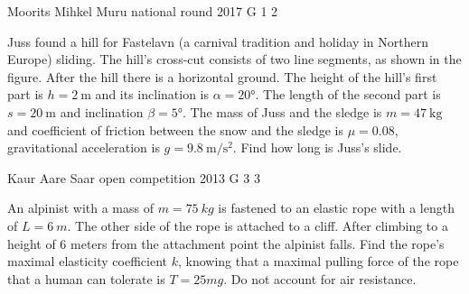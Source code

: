 \documentclass[11pt]{article}
\begin{document}
{Moorits Mihkel Muru} %
{national round} %
{2017} %
{G 1} %
{2} %
{

\ifEngStatement
\begin{figure}
	\vspace{-5pt}
\end{figure}
Juss found a hill for Fastelavn (a carnival tradition and holiday in Northern Europe) sliding. The hill’s cross-cut consists of two line segments, as shown in the figure. After the hill there is a horizontal ground. The height of the hill’s first part is \(h=\SI{2}{\meter}\) and its inclination is \(\alpha=\ang{20}\). The length of the second part is \(s=\SI{20}{\meter}\) and inclination \(\beta=\ang{5}\). The mass of Juss and the sledge is \(m=\SI{47}{\kilogram}\) and coefficient of friction between the snow and the sledge is \(\mu=\num{0.08}\), gravitational acceleration is \(g=\SI{9.8}{\meter\per\second\squared}\). Find how long is Juss’s slide.
\fi
}

{Kaur Aare Saar} %
{open competition} %
{2013} %
{G 3} %
{3} %
{

\ifEngStatement
An alpinist with a mass of $m=\SI{75}{kg}$ is fastened to an elastic rope with a length of $L=\SI{6}{m}$. The other side of the rope is attached to a cliff. After climbing to a height of 6 meters from the attachment point the alpinist falls. Find the rope’s maximal elasticity coefficient $k$, knowing that a maximal pulling force of the rope that a human can tolerate is $T=25mg$. Do not account for air resistance.
\fi
}
\end{document}
